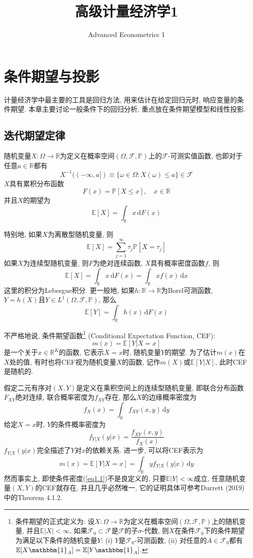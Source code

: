 \documentclass[cn, 12pt, math=mtpro2, bibstyle=apa, blue, twocol]{elegantbook}
\title{高级计量经济学1}
\subtitle{Advanced Econometrics 1}
\newcommand{\F}{\mathscr{F}}
\newcommand{\R}{\mathbb{R}}
\newcommand{\E}{\mathbb{E}}
\newcommand{\PP}{\mathbb{P}}
\begin{document}
\maketitle
\frontmatter

\tableofcontents

\mainmatter
\chapter{条件期望与投影}
计量经济学中最主要的工具是回归方法, 用来估计在给定回归元时, 响应变量的条件期望. 本章主要讨论一般条件下的回归分析, 重点放在条件期望模型和线性投影.
\section{迭代期望定律}
随机变量$X:\Omega\to\R$为定义在概率空间$(\Omega,\F,\PP)$上的$\F$-可测实值函数, 也即对于任意$a\in\R$都有
$$X^{-1}((-\infty,a])\equiv \{\omega\in\Omega: X(\omega)\leq a\}\in\F$$
$X$具有累积分布函数
$$F(x)=\PP[X\leq x],\quad x\in\R$$
并且$X$的期望为
$$\E[X]=\int_\R x\,\text{d}F(x)$$

特别地, 如果$X$为离散型随机变量, 则
$$\E[X]=\sum_{j=1}^{\infty}\tau_j\PP[X=\tau_j]$$
如果$X$为连续型随机变量, 则$F$为绝对连续函数, $X$具有概率密度函数$f$, 则
$$\E[X]=\int_\R x\,\text{d}F(x)=\int_\R xf(x)\,\text{d}x$$
这里的积分为Lebesgue积分. 更一般地, 如果$h:\R\to\R$为Borel可测函数, $Y=h(X)$且$Y\in L^1(\Omega,\F,\PP)$, 那么
$$\displaystyle\E[Y]=\int_\R h(x)\,\text{d}F(x)$$

不严格地说, 条件期望函数\footnote{条件期望的正式定义为: 设$X:\Omega\to\R$为定义在概率空间$(\Omega,\F,\PP)$上的随机变量, 并且$\E|X|<\infty$, 如果$\mathscr{F}_0\subset\F$是$\F$的子$\sigma$-代数, 则$X$在条件$\mathscr{F}_0$下的条件期望为满足以下条件的随机变量$Y$: (i) $Y$是$\mathscr{F}_0$-可测函数, (ii) 对任意的$A\in\mathscr{F}_0$都有$\E[X\mathbbm{1}_A]=\E[Y\mathbbm{1}_A]$.} (Conditional Expectation Function, CEF):
$$m(x)=\E[Y|X=x]$$
是一个关于$x\in\R^K$的函数, 它表示$X=x$时, 随机变量$Y$的期望. 为了估计$m(x)$在$X$处的值, 有时也将CEF视为随机变量$X$的函数, 记作$m(X)$或$\E[Y|X]$, 此时CEF是随机的.

假定二元有序对$(X,Y)$是定义在乘积空间上的连续型随机变量, 即联合分布函数$F_{XY}$绝对连续, 联合概率密度为$f_{XY}$存在, 那么$X$的边缘概率密度为
$$f_X(x)=\int_\R f_{XY}(x,y)\,\text{d}y$$
给定$X=x$时, $Y$的条件概率密度为
\begin{equation}\label{eq1.1}
  f_{Y|X}(y|x)=\frac{f_{XY}(x,y)}{f_X(x)}
\end{equation}
$f_{Y|X}(y|x)$完全描述了$Y$对$x$的依赖关系. 进一步, 可以将CEF表示为
$$m(x)=\E[Y|X=x]=\int_\R yf_{Y|X}(y|x)\,\text{d}y$$
然而事实上, 即使条件密度(\ref{eq1.1})不是良定义的, 只要$\E|Y|<\infty$成立, 任意随机变量$(X,Y)$的CEF就存在, 并且几乎必然唯一, 它的证明具体可参考Durrett (2019)中的Theorem 4.1.2.
\end{document}
